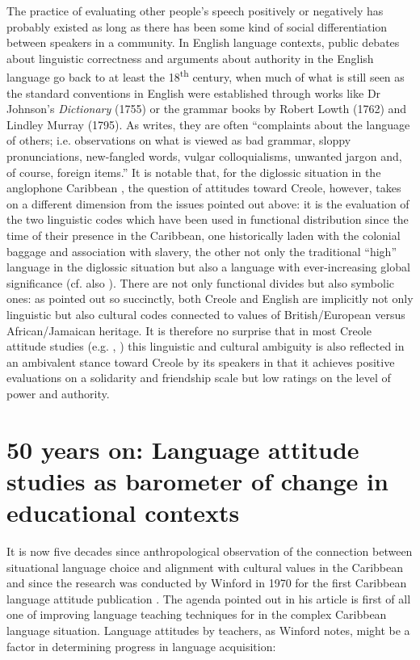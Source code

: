 \documentclass[output=paper,colorlinks,citecolor=brown]{langscibook}
\begin{document}
The practice of evaluating other people’s speech positively or negatively has probably existed as long as there has been some kind of social differentiation between speakers in a community. In English language contexts, public debates about linguistic correctness and arguments about authority in the English language go back to at least the 18\textsuperscript{th} century, when much of what is still seen as the standard conventions in English were established through works like Dr Johnson’s \textit{Dictionary} (1755) or the grammar books by Robert Lowth (1762) and Lindley Murray (1795). As \citet[5]{burridge2010linguistic} writes, they are often “complaints about the language of others; i.e. observations on what is viewed as bad grammar, sloppy pronunciations, new-fangled words, vulgar colloquialisms, unwanted jargon and, of course, foreign items.” It is notable that, for the diglossic situation in the anglophone Caribbean  \citep{Winford1985}, the question of attitudes toward Creole, however, takes on a different dimension from the issues pointed out above: it is the evaluation of the two linguistic codes which have been used in functional distribution since the time of their presence in the Caribbean, one historically laden with the colonial baggage and association with slavery, the other not only the traditional “high” language in the diglossic situation but also a language with ever-increasing global significance (cf. also \citealt{mühleisen2002creole}). There are not only functional divides but also symbolic ones: as \citet{reisman1970cultural} pointed out so succinctly, both Creole and English are implicitly not only linguistic but also cultural codes connected to values of British/European versus African/Jamaican heritage. It is therefore no surprise that in most Creole attitude studies (e.g. \citealt{rickford1983standard}, \citealt{BeckfordWassink1999}) this linguistic and cultural ambiguity is also reflected in an ambivalent stance toward Creole by its speakers in that it achieves positive evaluations on a solidarity and friendship scale but low ratings on the level of power and authority.

\section{50 years on: Language attitude studies as barometer of change in educational contexts}\label{sec:muehleisen:2}

It is now five decades since  anthropological observation of the connection between situational language choice and alignment with cultural values in the Caribbean and since the research was conducted by Winford in 1970 for the first Caribbean language attitude publication \citep{winford1976teacher}. The agenda pointed out in his article is first of all one of improving language teaching techniques for in the complex Caribbean language situation. Language attitudes by teachers, as Winford notes, might be a factor in determining progress in language acquisition:
\end{document}
